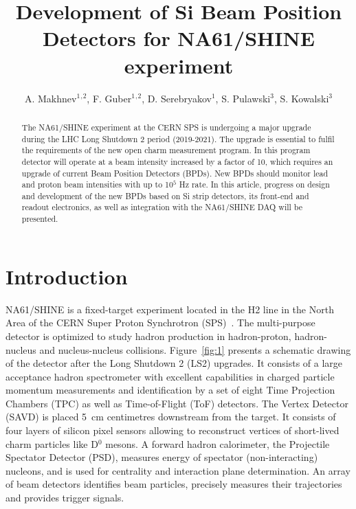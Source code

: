 \documentclass[a4paper]{jpconf}
\begin{document}
\title{Development of Si Beam Position Detectors for NA61/SHINE experiment}

\author{A. Makhnev$^1$$^,$$^2$, F. Guber$^1$$^,$$^2$, D. Serebryakov$^1$, S. Pulawski$^3$, S. Kowalski$^3$}

\address{$^1$Institute for Nuclear Research RAS, Moscow, Russia}
\address{$^2$Moscow Institute of Physics and Technology, Dolgoprudny, Moscow Region, Russia}
\address{$^3$Institute of Physics, University of Silesia, Chorzów, Poland}


\begin{abstract}
The NA61/SHINE experiment at the CERN SPS is undergoing a major upgrade during the LHC Long Shutdown 2 period (2019-2021). The upgrade is essential to fulfil the requirements of the new open charm measurement program. In this program detector will operate at a beam intensity increased by a factor of 10, which requires an upgrade of current Beam Position Detectors (BPDs). New BPDs should monitor lead and proton beam intensities with  up to 10$^5$ Hz rate. In this article, progress on design and development of the new BPDs based on Si strip detectors, its front-end and readout electronics, as well as integration with the NA61/SHINE DAQ will be presented.
\end{abstract}

\section{Introduction}

NA61/SHINE is a fixed-target experiment located in the H2 line in the North Area of the CERN Super Proton Synchrotron (SPS)~\cite{Abgrall:2014fa}. The multi-purpose detector is optimized to study hadron production in hadron-proton, hadron-nucleus and nucleus-nucleus collisions. Figure~\ref{fig:1} presents a schematic drawing of the detector after the Long Shutdown 2 (LS2) upgrades. It consists of a large acceptance hadron spectrometer with excellent capabilities in charged particle momentum measurements and identification by a set of eight Time Projection Chambers (TPC) as well as Time-of-Flight (ToF) detectors. The Vertex Detector (SAVD) is placed 5~cm centimetres downstream from the target. It consists of four layers of silicon pixel sensors allowing to reconstruct vertices of short-lived charm particles like D$^0$ mesons. A forward hadron calorimeter, the Projectile Spectator Detector (PSD), measures energy of spectator (non-interacting) nucleons, and is used for centrality and interaction plane determination. An array of beam detectors identifies beam particles, precisely measures their trajectories and provides trigger signals.
\end{document}
